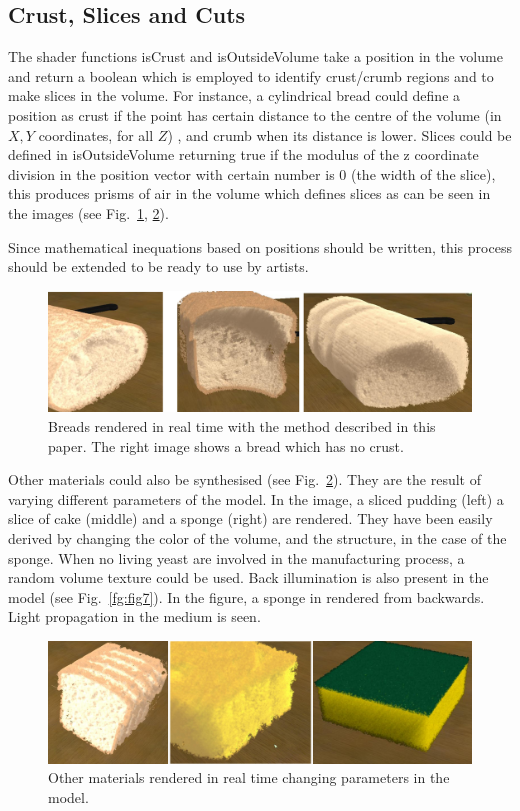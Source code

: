 \documentclass[oneside,a4paper,english,links]{amca}
\begin{document}
\subsection{Crust, Slices and Cuts}
The shader functions isCrust and isOutsideVolume take a position in the volume and return a boolean which is employed to identify crust/crumb regions and to make slices in the volume. For instance, a cylindrical bread could define a position as crust if the point has certain distance to the centre of the volume (in $X,Y$ coordinates, for all $Z$) , and crumb when its distance is lower. Slices could be defined in isOutsideVolume returning true if the modulus of the z coordinate division in the position vector with certain number is $0$ (the width of the slice), this produces prisms of air in the volume which defines slices as can be seen in the images (see Fig.~\ref{fg:fig5}, \ref{fg:fig6}).

Since mathematical inequations based on positions should be written, this process should be extended to be ready to use by artists.

\begin{figure}[htb!]
  \centerline{\includegraphics[scale=0.3]{fig5}}
  \caption{Breads rendered in real time with the method described in this paper. The right image shows a bread which has no crust. }
  \label{fg:fig5}
\end{figure}

Other materials could also be synthesised (see Fig.~\ref{fg:fig6}). They are the result of varying different parameters of the model. In the image, a sliced pudding (left) a slice of cake (middle) and a sponge (right) are rendered. They have been easily derived by changing the color of the volume, and the structure, in the case of the sponge. When no living yeast are involved in the manufacturing process, a random volume texture could be used. Back illumination is also present in the model (see Fig.~\ref{fg:fig7}). In the figure, a sponge in rendered from backwards. Light propagation in the medium is seen.

\begin{figure}[htb!]
  \centerline{\includegraphics[scale=0.3]{fig6}}
  \caption{Other materials rendered in real time changing parameters in the model. }
  \label{fg:fig6}
\end{figure}
\end{document}
